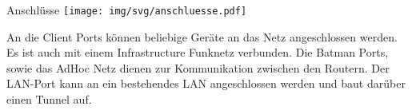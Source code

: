 %

\begin{frame}{Anschlüsse}
\texttt{[image: img/svg/anschluesse.pdf]}

An die Client Ports können beliebige Geräte an das Netz angeschlossen werden. Es ist auch mit einem Infrastructure Funknetz verbunden. Die Batman Ports, sowie das AdHoc Netz dienen zur Kommunikation zwischen den Routern. Der LAN-Port kann an ein bestehendes LAN angeschlossen werden und baut darüber einen Tunnel auf.
\end{frame}
